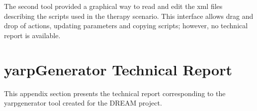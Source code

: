 The second tool provided a graphical way to read and edit the xml files describing the scripts used in the therapy scenario. This interface allows drag and drop of actions, updating parameters and copying scripts; however, no technical report is available.

\cleartooddpage
\chapter{yarpGenerator Technical Report} \label{app:yarpgenerator}
This appendix section presents the technical report corresponding to the yarpgenerator tool created for the DREAM project.



